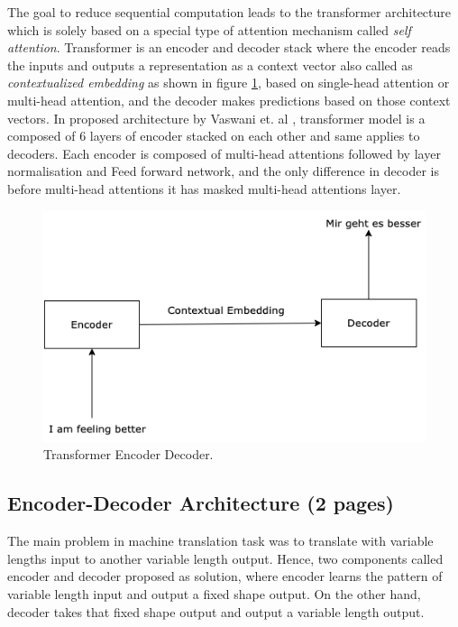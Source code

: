 \documentclass[%
	BCOR=8mm, %
	DIV=12, 
	toc=bibliography, %
	toc=listof, %
	oneside, %
	egregdoesnotlikesansseriftitles, %
	]{scrbook}
\begin{document}
The goal to reduce sequential computation leads to the transformer architecture which is solely based on a special type of attention mechanism called \textit{self attention}. Transformer is an encoder and decoder stack where the encoder reads the inputs and outputs a representation as a context vector also called as \textit{contextualized embedding} as shown in figure \ref{diag:EncoderDecoder}, based 
on single-head attention or multi-head attention, and the decoder makes predictions based on those context vectors. In proposed architecture by Vaswani et. al \cite{vaswani_attention_2017}, 
transformer model is a composed of 6 layers of encoder stacked on each other and same applies to decoders.  Each encoder is composed of multi-head attentions followed by layer normalisation and Feed forward network, and the only difference in decoder is before multi-head attentions it has masked multi-head attentions layer. 

\begin{figure}[h!]
\centering
\includegraphics[width=.50\textwidth]{img/encoderDecoder.png}
\caption[Encoder Decoder]{Transformer Encoder Decoder.}
\label{diag:EncoderDecoder}
\end{figure}

\subsection{Encoder-Decoder Architecture (2 pages)}

The main problem in machine translation task was to translate with variable lengths input to another variable length output. Hence, two components called encoder and decoder proposed as solution, where encoder learns the pattern of variable length input and output a fixed shape output.  On the other hand, decoder takes that fixed shape output and output a variable length output.  
\end{document}
